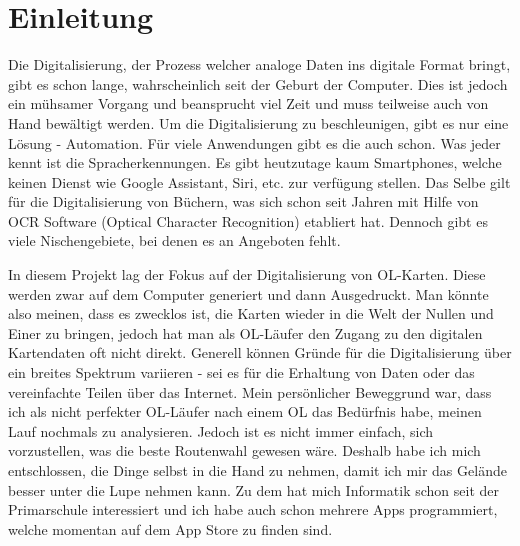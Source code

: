 \section{Einleitung}

Die Digitalisierung, der Prozess welcher analoge Daten ins digitale Format bringt, gibt es schon lange, wahrscheinlich seit der Geburt der Computer. Dies ist jedoch ein mühsamer Vorgang und beansprucht viel Zeit und muss teilweise auch von Hand bewältigt werden. Um die Digitalisierung  zu beschleunigen, gibt es nur eine Lösung - Automation. Für viele Anwendungen gibt es die auch schon. Was jeder kennt ist  die Spracherkennungen. Es gibt heutzutage kaum Smartphones, welche keinen Dienst wie Google Assistant, Siri, etc. zur verfügung stellen. Das Selbe gilt für die Digitalisierung von Büchern, was sich schon seit Jahren mit Hilfe von OCR Software (Optical Character Recognition) etabliert hat. Dennoch gibt es viele Nischengebiete, bei denen es an Angeboten fehlt.

In diesem Projekt lag der Fokus auf der Digitalisierung von OL-Karten. Diese werden zwar auf dem Computer generiert und dann Ausgedruckt. Man könnte also meinen, dass es zwecklos ist, die Karten wieder in die Welt der Nullen und Einer zu bringen, jedoch hat man als OL-Läufer den Zugang zu den digitalen Kartendaten oft nicht direkt. Generell können Gründe für die Digitalisierung über ein breites Spektrum variieren - sei es für die Erhaltung von Daten oder das vereinfachte Teilen über das Internet. Mein persönlicher Beweggrund war, dass ich als nicht perfekter OL-Läufer nach einem OL das Bedürfnis habe, meinen Lauf nochmals zu analysieren. Jedoch ist es nicht immer einfach, sich vorzustellen, was die beste Routenwahl gewesen wäre. Deshalb habe ich mich entschlossen, die Dinge selbst in die Hand zu nehmen, damit ich mir das Gelände besser unter die Lupe nehmen kann. Zu dem hat mich Informatik schon seit der Primarschule interessiert und ich habe auch schon mehrere Apps programmiert, welche momentan auf dem App Store zu finden sind.